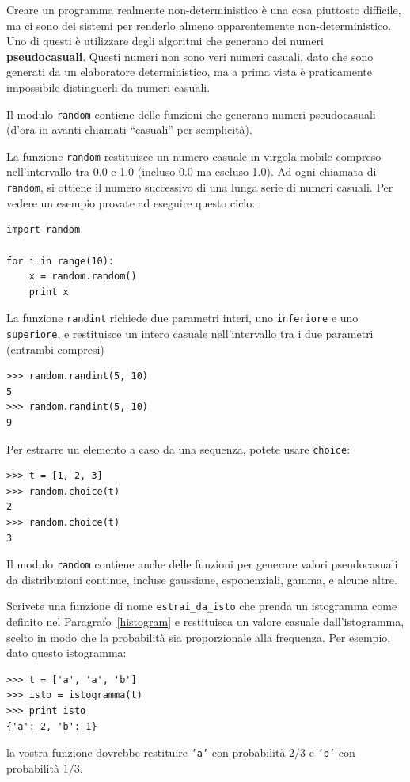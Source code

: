\documentclass[10pt]{book}
\begin{document}
Creare un programma realmente non-deterministico è una cosa piuttosto difficile, ma ci sono dei sistemi per renderlo almeno apparentemente non-deterministico. Uno di questi è utilizzare degli algoritmi che generano dei numeri {\bf pseudocasuali}. Questi numeri non sono veri numeri casuali, dato che sono generati da un elaboratore deterministico, ma a prima vista è praticamente impossibile distinguerli da numeri casuali.

Il modulo {\tt random} contiene delle funzioni che generano numeri pseudocasuali (d'ora in avanti chiamati ``casuali'' per semplicità).

La funzione {\tt random} restituisce un numero casuale in virgola mobile compreso nell'intervallo tra 0.0 e 1.0 (incluso 0.0 ma escluso 1.0).  Ad ogni chiamata di {\tt random}, si ottiene il numero successivo di una lunga serie di numeri casuali. Per vedere un esempio provate ad eseguire questo ciclo:

\begin{verbatim}
import random

for i in range(10):
    x = random.random()
    print x
\end{verbatim}
%
La funzione {\tt randint} richiede due parametri interi, uno  {\tt inferiore} e uno  {\tt superiore}, e restituisce un intero casuale nell'intervallo tra i due parametri (entrambi compresi)

\begin{verbatim}
>>> random.randint(5, 10)
5
>>> random.randint(5, 10)
9
\end{verbatim}
%
Per estrarre un elemento a caso da una sequenza, potete usare
{\tt choice}:

\begin{verbatim}
>>> t = [1, 2, 3]
>>> random.choice(t)
2
>>> random.choice(t)
3
\end{verbatim}
%
Il modulo {\tt random} contiene anche delle funzioni per generare valori pseudocasuali da distribuzioni continue, incluse gaussiane, esponenziali, gamma, e alcune altre.

\vspace{0.2in}
\begin{exercise}

Scrivete una funzione di nome \verb"estrai_da_isto" che prenda un istogramma come definito nel Paragrafo~\ref{histogram} e restituisca un valore casuale dall'istogramma, scelto in modo che la probabilità sia proporzionale alla frequenza. Per esempio, dato questo istogramma:

\begin{verbatim}
>>> t = ['a', 'a', 'b']
>>> isto = istogramma(t)
>>> print isto
{'a': 2, 'b': 1}
\end{verbatim}
%
la vostra funzione dovrebbe restituire {\tt 'a'} con probabilità $2/3$ e {\tt 'b'} con probabilità $1/3$.
\end{exercise}
\end{document}
